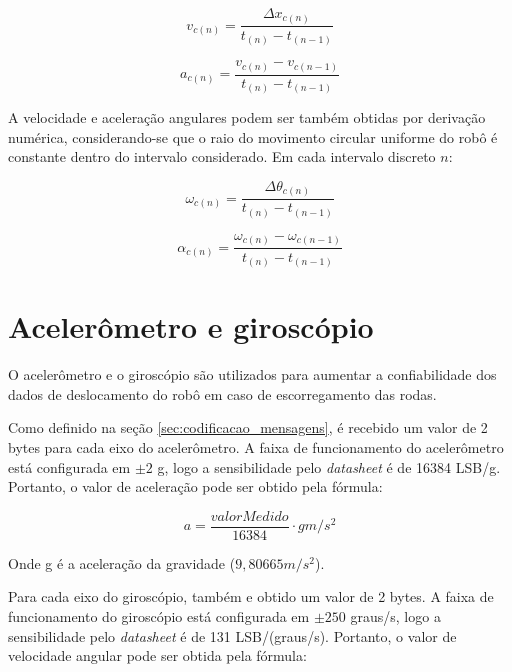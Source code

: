 \begin{equation}
  v_{c (n)} = \frac{\Delta x_{c (n)} }{t_{(n)} - t_{(n-1)}}
  \label{eq:velocidade_encoders}
\end{equation}

\begin{equation}
  a_{c (n)} = \frac{v_{c (n)} - v_{c (n-1)}}{t_{(n)} - t_{(n-1)}}
  \label{eq:aceleracao_encoders}
\end{equation}


A velocidade e aceleração angulares podem ser também obtidas por derivação numérica, considerando-se que o raio do movimento circular uniforme do robô é constante dentro do intervalo considerado. Em cada intervalo discreto $n$:

\begin{equation}
  \omega_{c (n)} = \frac{\Delta \theta_{c (n)} }{t_{(n)} - t_{(n-1)}}
  \label{eq:omega_encoders}
\end{equation}

\begin{equation}
  \alpha_{c (n)} = \frac{\omega_{c (n)} - \omega_{c (n-1)}}{t_{(n)} - t_{(n-1)}}
  \label{eq:alpha_encoders}
\end{equation}


\section{Acelerômetro e giroscópio}
\label{sec:teoria_acel_giro}

O acelerômetro e o giroscópio são utilizados para aumentar a confiabilidade dos dados de deslocamento do robô em caso de escorregamento das rodas.

Como definido na seção \ref{sec:codificacao_mensagens}, é recebido um valor de 2 bytes para cada eixo do acelerômetro. A faixa de funcionamento do acelerômetro está configurada em $\pm 2$ g, logo a sensibilidade pelo \textit{datasheet} é de 16384 LSB/g. Portanto, o valor de aceleração pode ser obtido pela fórmula:

\begin{equation}
  a = \frac{valorMedido}{16384} \cdot g \unit{m/s^2}
  \label{eq:acel}
\end{equation}

Onde g é a aceleração da gravidade ($9,80665 \unit{m/s^2}$). 

Para cada eixo do giroscópio, também e obtido um valor de 2 bytes. A faixa de funcionamento do giroscópio está configurada em $\pm 250$ graus/s, logo a sensibilidade pelo \textit{datasheet} é de 131 LSB/(graus/s). Portanto, o valor de velocidade angular pode ser obtida pela fórmula:

